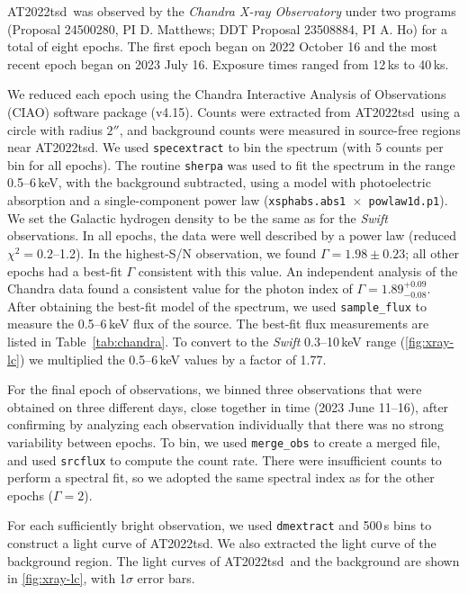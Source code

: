 \documentclass{nature_plusfigure}
\newcommand{\at}{AT2022tsd}
\begin{document}
\begin{methods}
\at\ was observed by the \emph{Chandra X-ray Observatory} under two programs (Proposal 24500280, PI D. Matthews; DDT Proposal 23508884, PI A. Ho) for a total of eight epochs. The first epoch began on 2022 October 16 and the most recent epoch began on 2023 July 16. Exposure times ranged from 12\,ks to 40\,ks.

We reduced each epoch using the Chandra Interactive Analysis of Observations (CIAO\cite{Fruscione2006}) software package (v4.15). Counts were extracted from \at\ using a circle with radius $2''$, and background counts were measured in source-free regions near \at.
We used \texttt{specextract} to bin the spectrum (with 5 counts per bin for all epochs). The routine \texttt{sherpa} was used to fit the spectrum in the range 0.5--6\,keV, with the background subtracted, using a model with photoelectric absorption and a single-component power law (\texttt{xsphabs.abs1 $\times$ powlaw1d.p1}). We set the Galactic hydrogen density to be the same as for the \emph{Swift} observations. In all epochs, the data were well described by a power law (reduced $\chi^2=0.2$--1.2). In the highest-S/N observation, we found $\Gamma=1.98\pm0.23$; all other epochs had a best-fit $\Gamma$ consistent with this value.
An independent analysis of the Chandra data\cite{Matthews2023} found a consistent value for the photon index of $\Gamma=1.89^{+0.09}_{-0.08}$.
After obtaining the best-fit model of the spectrum, we used \texttt{sample\_flux} to measure the 0.5--6\,keV flux of the source. The best-fit flux measurements are listed in Table~\ref{tab:chandra}. To convert to the \emph{Swift} 0.3--10\,keV range (\ref{fig:xray-lc}) we multiplied the 0.5--6\,keV values by a factor of 1.77.

For the final epoch of observations, we binned three observations that were obtained on three different days, close together in time (2023 June 11--16), after confirming by analyzing each observation individually that there was no strong variability between epochs. To bin, we used \texttt{merge\_obs} to create a merged file, and used \texttt{srcflux} to compute the count rate. There were insufficient counts to perform a spectral fit, so we adopted the same spectral index as for the other epochs ($\Gamma=2$). 

For each sufficiently bright observation, we used \texttt{dmextract} and 500\,s bins to construct a light curve of \at. We also extracted the light curve of the background region. The light curves of \at\ and the background are shown in \ref{fig:xray-lc}, with 1$\sigma$ error bars.


\end{methods}
\end{document}

